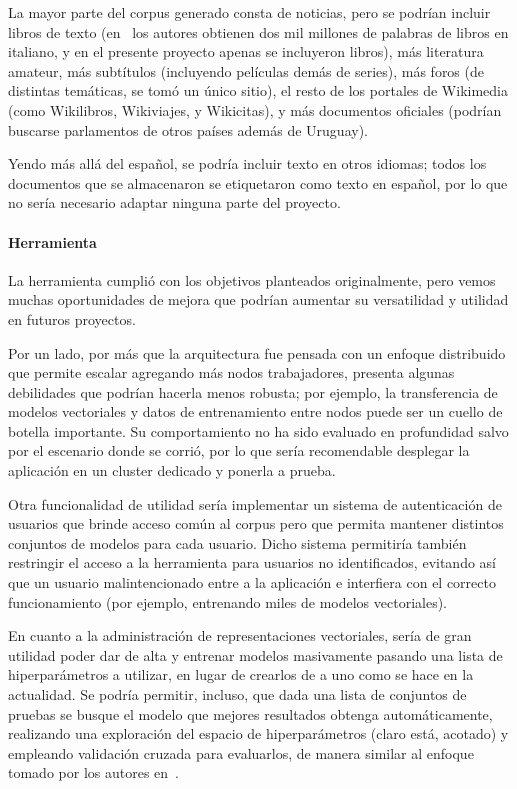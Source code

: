 La mayor parte del corpus generado consta de noticias, pero se podrían incluir libros de texto
(en~\cite{Berardi2015} los autores obtienen dos mil millones de palabras de libros en italiano, y en
el presente proyecto apenas se incluyeron libros), más literatura amateur, más subtítulos
(incluyendo películas demás de series), más foros (de distintas temáticas, se tomó un único sitio),
el resto de los portales de Wikimedia (como Wikilibros, Wikiviajes, y Wikicitas), y más documentos
oficiales (podrían buscarse parlamentos de otros países además de Uruguay).

Yendo más allá del español, se podría incluir texto en otros idiomas; todos los documentos que se
almacenaron se etiquetaron como texto en español, por lo que no sería necesario adaptar ninguna
parte del proyecto.


\paragraph{Herramienta}

La herramienta cumplió con los objetivos planteados originalmente, pero vemos muchas oportunidades
de mejora que podrían aumentar su versatilidad y utilidad en futuros proyectos.

Por un lado, por más que la arquitectura fue pensada con un enfoque distribuido que permite escalar
agregando más nodos trabajadores, presenta algunas debilidades que podrían hacerla menos robusta;
por ejemplo, la transferencia de modelos vectoriales y datos de entrenamiento entre nodos puede ser
un cuello de botella importante. Su comportamiento no ha sido evaluado en profundidad salvo por el
escenario donde se corrió, por lo que sería recomendable desplegar la aplicación en un cluster
dedicado y ponerla a prueba.

Otra funcionalidad de utilidad sería implementar un sistema de autenticación de usuarios que brinde
acceso común al corpus pero que permita mantener distintos conjuntos de modelos para cada
usuario. Dicho sistema permitiría también restringir el acceso a la herramienta para usuarios no
identificados, evitando así que un usuario malintencionado entre a la aplicación e interfiera con el
correcto funcionamiento (por ejemplo, entrenando miles de modelos vectoriales).

En cuanto a la administración de representaciones vectoriales, sería de gran utilidad poder dar de
alta y entrenar modelos masivamente pasando una lista de hiperparámetros a utilizar, en lugar de
crearlos de a uno como se hace en la actualidad. Se podría permitir, incluso, que dada una lista de
conjuntos de pruebas se busque el modelo que mejores resultados obtenga automáticamente, realizando
una exploración del espacio de hiperparámetros (claro está, acotado) y empleando validación cruzada
para evaluarlos, de manera similar al enfoque tomado por los autores en~\cite{Levy2015}.

